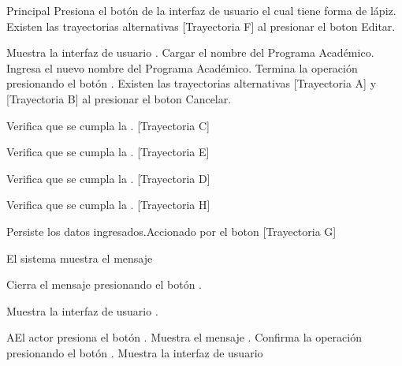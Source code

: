 \begin{UCtrayectoria}{Principal}
    \UCpaso[\UCactor] Presiona el botón  de la interfaz de usuario  el cual tiene forma de lápiz. Existen las trayectorias alternativas [Trayectoria F] al presionar el boton Editar.    

    \UCpaso Muestra la interfaz de usuario .
    \UCpaso Cargar el nombre del Programa Académico. 
    \UCpaso[\UCactor] Ingresa el nuevo nombre del Programa Académico.
    \UCpaso[\UCactor] Termina la operación presionando el botón . Existen las trayectorias alternativas [Trayectoria A] y [Trayectoria B] al presionar el boton Cancelar.

    \UCpaso Verifica que se cumpla la . [Trayectoria C]

    \UCpaso Verifica que se cumpla la . [Trayectoria E]

    \UCpaso Verifica que se cumpla la . [Trayectoria D]    

    \UCpaso Verifica que se cumpla la . [Trayectoria H]    

    \UCpaso Persiste los datos ingresados.Accionado por el boton  [Trayectoria G]

    \UCpaso El sistema muestra el mensaje 

    \UCpaso[\UCactor] Cierra el mensaje presionando el botón .

    \UCpaso Muestra la interfaz de usuario .
\end{UCtrayectoria}
\begin{UCtrayectoriaA}{A}{El actor presiona el botón .}
    \UCpaso Muestra el mensaje .
    \UCpaso[\UCactor] Confirma la operación presionando el botón .
    \UCpaso Muestra la interfaz de usuario 
\end{UCtrayectoriaA}

